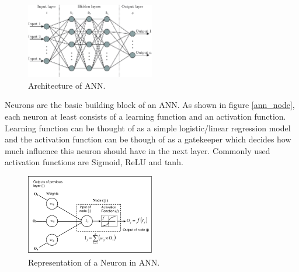 \documentclass[twoside,11pt,a4paper]{article}
\begin{document}
\begin{figure}[ht]
	\centering
	\includegraphics[width=0.5\textwidth]{ann}
	\caption[Architecture of \acf{ANN}.]{Architecture of \acf{ANN}\cite{bre2018prediction}.}
	\label{fig:ann}
\end{figure}
Neurons are the basic building block of an \acs{ANN}. As shown in figure \ref{ann_node}, each neuron at least consists of a learning function and an activation function. Learning function can be thought of as a simple logistic/linear regression model and the activation function can be though of as a gatekeeper which decides how much influence this neuron should have in the next layer. Commonly used activation functions are Sigmoid, \acs{ReLU} and tanh. 
\begin{figure}[ht]
	\centering
	\includegraphics[width=0.5\textwidth]{ann_node}
	\caption[Representation of a Neuron in \acf{ANN}.]{Representation of a Neuron in \acf{ANN}.\cite{ghedira2004effect}}
	\label{fig:ann_node}
\end{figure}
\end{document}
